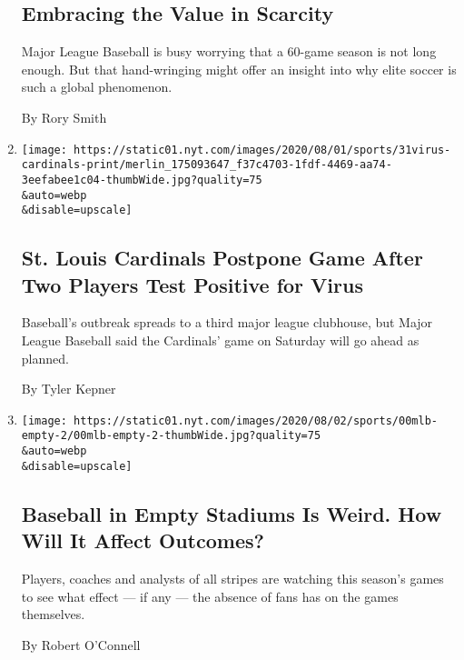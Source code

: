 \begin{enumerate}
  \hypertarget{embracing-the-value-in-scarcity}{%
  \subsection{Embracing the Value in
  Scarcity}\label{embracing-the-value-in-scarcity}}

  Major League Baseball is busy worrying that a 60-game season is not
  long enough. But that hand-wringing might offer an insight into why
  elite soccer is such a global phenomenon.

  By Rory Smith
\item
  \href{/2020/07/31/sports/baseball/cardinals-twins-coronavirus-mlb.html}{}

  \texttt{[image: https://static01.nyt.com/images/2020/08/01/sports/31virus-cardinals-print/merlin\_175093647\_f37c4703-1fdf-4469-aa74-3eefabee1c04-thumbWide.jpg?quality=75\\\&auto=webp\\\&disable=upscale]}

  \hypertarget{st-louis-cardinals-postpone-game-after-two-players-test-positive-for-virus}{%
  \subsection{St. Louis Cardinals Postpone Game After Two Players Test
  Positive for
  Virus}\label{st-louis-cardinals-postpone-game-after-two-players-test-positive-for-virus}}

  Baseball's outbreak spreads to a third major league clubhouse, but
  Major League Baseball said the Cardinals' game on Saturday will go
  ahead as planned.

  By Tyler Kepner
\item
  \href{/2020/07/31/sports/baseball/baseball-empty-stadiums-effects.html}{}

  \texttt{[image: https://static01.nyt.com/images/2020/08/02/sports/00mlb-empty-2/00mlb-empty-2-thumbWide.jpg?quality=75\\\&auto=webp\\\&disable=upscale]}

  \hypertarget{baseball-in-empty-stadiums-is-weird-how-will-it-affect-outcomes}{%
  \subsection{Baseball in Empty Stadiums Is Weird. How Will It Affect
  Outcomes?}\label{baseball-in-empty-stadiums-is-weird-how-will-it-affect-outcomes}}

  Players, coaches and analysts of all stripes are watching this
  season's games to see what effect --- if any --- the absence of fans
  has on the games themselves.

  By Robert O'Connell
\end{enumerate}

